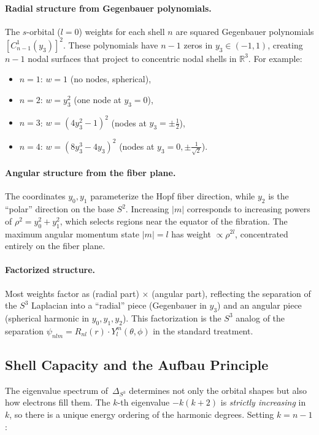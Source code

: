 \documentclass[12pt, a4paper]{article}
\theoremstyle{definition}
\theoremstyle{remark}
\newcommand{\Sthree}{S^3}
\newcommand{\Stwo}{S^2}
\newcommand{\R}{\mathbb{R}}
\newcommand{\lap}{\Delta_{\Sthree}}
\begin{document}
\paragraph{Radial structure from Gegenbauer polynomials.}
The $s$-orbital ($l=0$) weights for each shell $n$ are squared Gegenbauer
polynomials $[C_{n-1}^1(y_3)]^2$. These polynomials have $n-1$ zeros in
$y_3 \in (-1, 1)$, creating $n-1$ nodal surfaces that project to concentric
nodal shells in $\R^3$. For example:
\begin{itemize}[nosep]
  \item $n=1$: $w = 1$ (no nodes, spherical),
  \item $n=2$: $w = y_3^2$ (one node at $y_3 = 0$),
  \item $n=3$: $w = (4y_3^2 - 1)^2$ (nodes at $y_3 = \pm\tfrac{1}{2}$),
  \item $n=4$: $w = (8y_3^3 - 4y_3)^2$ (nodes at $y_3 = 0, \pm\tfrac{1}{\sqrt{2}}$).
\end{itemize}

\paragraph{Angular structure from the fiber plane.}
The coordinates $y_0, y_1$ parameterize the Hopf fiber direction, while
$y_2$ is the ``polar'' direction on the base $\Stwo$. Increasing $|m|$
corresponds to increasing powers of $\rho^2 = y_0^2 + y_1^2$, which
selects regions near the equator of the fibration. The maximum angular
momentum state $|m| = l$ has weight $\propto \rho^{2l}$, concentrated
entirely on the fiber plane.

\paragraph{Factorized structure.}
Most weights factor as (radial part) $\times$ (angular part), reflecting the
separation of the $\Sthree$ Laplacian into a ``radial'' piece
(Gegenbauer in $y_3$) and an angular piece (spherical harmonic in
$y_0, y_1, y_2$). This factorization is the $\Sthree$ analog of the
separation $\psi_{nlm} = R_{nl}(r) \cdot Y_l^m(\theta, \phi)$ in the
standard treatment.

\subsection{Shell Capacity and the Aufbau Principle}
\label{sec:aufbau}

The eigenvalue spectrum of~$\lap$ determines not only the orbital shapes but
also how electrons fill them. The $k$-th eigenvalue $-k(k{+}2)$ is
\emph{strictly increasing} in~$k$, so there is a unique energy ordering of
the harmonic degrees. Setting $k = n{-}1$:
\end{document}
